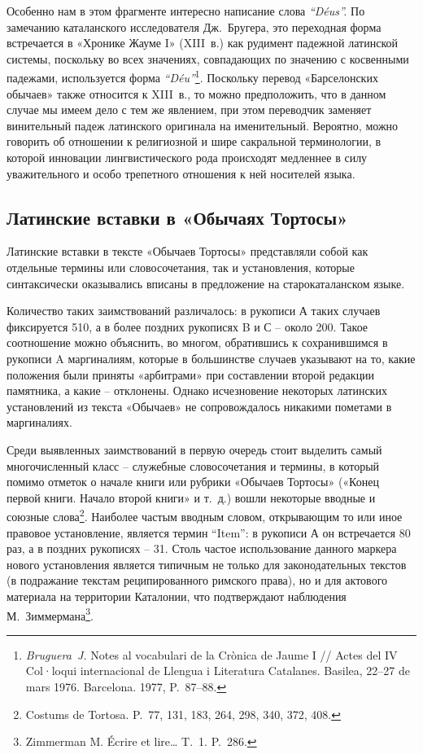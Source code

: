 Особенно нам в этом фрагменте интересно написание слова \emph{“Déu}\emph{s}\emph{”.} По замечанию каталанского исследователя Дж.~Бругера, это переходная форма встречается в «Хронике Жауме I» (XIII~в.) как рудимент падежной латинской системы, поскольку во всех значениях, совпадающих по значению с косвенными падежами, используется форма \emph{“Déu”}\footnote{\emph{Bruguera~J.} Notes al vocabulari de la Crònica de Jaume I // Actes del IV Col·loqui internacional de Llengua i Literatura Catalanes. Basilea, 22--27 de mars 1976. Barcelona. 1977, P.~87--88.}. Поскольку перевод «Барселонских обычаев» также относится к XIII~в., то можно предположить, что в данном случае мы имеем дело с тем же явлением, при этом переводчик заменяет винительный падеж латинского оригинала на именительный. Вероятно, можно говорить об отношении к религиозной и шире сакральной терминологии, в которой инновации лингвистического рода происходят медленнее в силу уважительного и особо трепетного отношения к ней носителей языка.

\subsection{Латинские вставки в «Обычаях Тортосы»}

Латинские вставки в тексте «Обычаев Тортосы» представляли собой как отдельные термины или словосочетания, так и установления, которые синтаксически оказывались вписаны в предложение на старокаталанском языке.

Количество таких заимствований различалось: в рукописи А таких случаев фиксируется 510, а в более поздних рукописях B и С -- около 200. Такое соотношение можно объяснить, во многом, обратившись к сохранившимся в рукописи A маргиналиям, которые в большинстве случаев указывают на то, какие положения были приняты «арбитрами» при составлении второй редакции памятника, а какие -- отклонены. Однако исчезновение некоторых латинских установлений из текста «Обычаев» не сопровождалось никакими пометами в маргиналиях.

Среди выявленных заимствований в первую очередь стоит выделить самый многочисленный класс -- служебные словосочетания и термины, в который помимо отметок о начале книги или рубрики «Обычаев Тортосы» («Конец первой книги. Начало второй книги» и т.~д.) вошли некоторые вводные и союзные слова\footnote{Costums de Tortosa. P.~77, 131, 183, 264, 298, 340, 372, 408.}. Наиболее частым вводным словом, открывающим то или иное правовое установление, является термин “Item”: в рукописи А он встречается 80 раз, а в поздних рукописях -- 31. Столь частое использование данного маркера нового установления является типичным не только для законодательных текстов (в подражание текстам реципированного римского права), но и для актового материала на территории Каталонии, что подтверждают наблюдения М.~Зиммермана\footnote{Zimmerman M. Écrire et lire… T.~1. P.~286.}.

